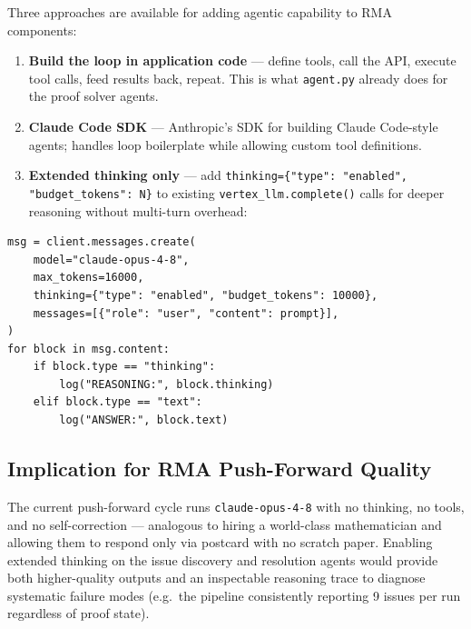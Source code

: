 \documentclass[11pt]{article}
\begin{document}
Three approaches are available for adding agentic capability to RMA components:

\begin{enumerate}[nosep]
  \item \textbf{Build the loop in application code} --- define tools,
    call the API, execute tool calls, feed results back, repeat.
    This is what \texttt{agent.py} already does for the proof solver agents.

  \item \textbf{Claude Code SDK} --- Anthropic's SDK for building Claude
    Code-style agents; handles loop boilerplate while allowing custom tool
    definitions.

  \item \textbf{Extended thinking only} --- add
    \texttt{thinking=\{"type": "enabled", "budget\_tokens": N\}} to existing
    \texttt{vertex\_llm.complete()} calls for deeper reasoning without
    multi-turn overhead:
\end{enumerate}

\begin{lstlisting}[caption={Enabling extended thinking on Vertex AI.}]
msg = client.messages.create(
    model="claude-opus-4-8",
    max_tokens=16000,
    thinking={"type": "enabled", "budget_tokens": 10000},
    messages=[{"role": "user", "content": prompt}],
)
for block in msg.content:
    if block.type == "thinking":
        log("REASONING:", block.thinking)
    elif block.type == "text":
        log("ANSWER:", block.text)
\end{lstlisting}

\subsection{Implication for RMA Push-Forward Quality}

The current push-forward cycle runs \texttt{claude-opus-4-8} with no thinking,
no tools, and no self-correction --- analogous to hiring a world-class
mathematician and allowing them to respond only via postcard with no scratch paper.
Enabling extended thinking on the issue discovery and resolution agents would
provide both higher-quality outputs and an inspectable reasoning trace to
diagnose systematic failure modes (e.g.\ the pipeline consistently reporting
9 issues per run regardless of proof state).
\end{document}
